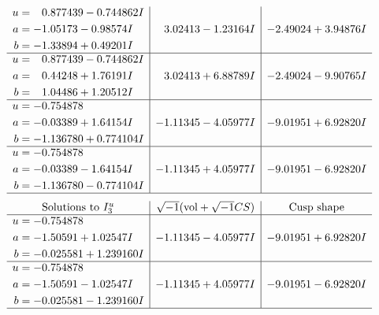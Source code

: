\documentclass[1p]{elsarticle_modified}
\theoremstyle{definition}
\newcommand{\I}{\sqrt{-1}}
\begin{document}
$$\begin{array}{c|c|c}
\begin{aligned}
u &= \phantom{-}0.877439 - 0.744862 I \\
a &= -1.05173 - 0.98574 I \\
b &= -1.33894 + 0.49201 I\end{aligned}
 & \phantom{-}3.02413 - 1.23164 I & -2.49024 + 3.94876 I \\ \hline\begin{aligned}
u &= \phantom{-}0.877439 - 0.744862 I \\
a &= \phantom{-}0.44248 + 1.76191 I \\
b &= \phantom{-}1.04486 + 1.20512 I\end{aligned}
 & \phantom{-}3.02413 + 6.88789 I & -2.49024 - 9.90765 I \\ \hline\begin{aligned}
u &= -0.754878\phantom{ +0.000000I} \\
a &= -0.03389 + 1.64154 I \\
b &= -1.136780 + 0.774104 I\end{aligned}
 & -1.11345 - 4.05977 I & -9.01951 + 6.92820 I \\ \hline\begin{aligned}
u &= -0.754878\phantom{ +0.000000I} \\
a &= -0.03389 - 1.64154 I \\
b &= -1.136780 - 0.774104 I\end{aligned}
 & -1.11345 + 4.05977 I & -9.01951 - 6.92820 I\\
 \hline 
 \end{array}$$\newpage$$\begin{array}{c|c|c}  
\text{Solutions to }I^u_{3}& \I (\text{vol} + \sqrt{-1}CS) & \text{Cusp shape}\\
 \hline 
\begin{aligned}
u &= -0.754878\phantom{ +0.000000I} \\
a &= -1.50591 + 1.02547 I \\
b &= -0.025581 + 1.239160 I\end{aligned}
 & -1.11345 - 4.05977 I & -9.01951 + 6.92820 I \\ \hline\begin{aligned}
u &= -0.754878\phantom{ +0.000000I} \\
a &= -1.50591 - 1.02547 I \\
b &= -0.025581 - 1.239160 I\end{aligned}
 & -1.11345 + 4.05977 I & -9.01951 - 6.92820 I\\
 \hline 
 \end{array}$$\newpage\newpage\renewcommand{\arraystretch}{1}
\end{document}
